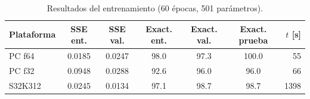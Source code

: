 \begin{table}[t]
\centering
\caption{Resultados del entrenamiento (60 épocas, 501 parámetros).}
\label{tab:entrenamiento}
\scriptsize
\setlength{\tabcolsep}{2.5pt}
\begin{tabular}{lcccccr}
\toprule
Plataforma & SSE ent. & SSE val. & Exact. ent. & Exact. val. & Exact. prueba & $t$ [s] \\
\midrule
PC f64 & 0.0185 & 0.0247 & 98.0 & 97.3 & 100.0 & 55 \\
PC f32 & 0.0948 & 0.0288 & 92.6 & 96.0 & 96.0 & 66 \\
S32K312 & 0.0245 & 0.0134 & 97.1 & 98.7 & 98.7 & 1398 \\
\bottomrule
\end{tabular}
\end{table}

